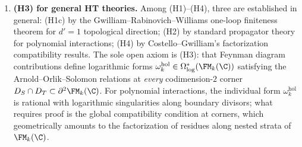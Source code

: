 \begin{enumerate}
 \emph{Geometric reframing via associated variety.}
 The Li--bar spectral sequence
 (Construction~\ref{constr:li-bar-spectral-sequence})
 and the associated-variety criterion
 (Theorem~\ref{thm:associated-variety-koszulness})
 reframe the free strong generation gap geometrically:
 once the full Li associated graded
 $R_{L_k}=\operatorname{gr}^F L_k$ is identified, diagonal
 concentration on the reduced Li--bar $E_2$ page constrains the
 Li--bar $E_2$ page. What the reduced geometry does
 \emph{not} control is the nilradical of~$R_{L_k}$.
 The present theorem does not identify that reduced
 Li--bar page with ordinary Poisson cohomology or with
 $H^*(\widetilde{\mathbb{O}}, \mathcal{O}_{\widetilde{\mathbb{O}}})$
 for a symplectic resolution. Thus non-degenerate admissible
 and minimal-orbit levels have reduced-level test surfaces, but
 unconditional Koszulness still requires a nilradical/reducedness
 check. Large-orbit
 levels ($X = \mathcal{N}$, $\fg = \mathfrak{sl}_N$, $N \geq 3$)
 are explicitly obstructed
 (Proposition~\ref{prop:large-orbit-obstruction}).
 Symplectic-resolution geometry supplies a heuristic guide for the
 hierarchy, not a proof of the nilradical/reducedness step.

\item \textbf{(H3) for general HT theories.}
 Among (H1)--(H4), three are established in general:
 (H1c) by the Gwilliam--Rabinovich--Williams one-loop finiteness
 theorem for $d' = 1$ topological direction; (H2) by standard
 propagator theory for polynomial interactions; (H4) by
 Costello--Gwilliam's factorization compatibility results.
 The sole open axiom is (H3): that Feynman diagram contributions
 define logarithmic forms $\omega_k^{\mathrm{hol}} \in
 \Omega^*_{\log}(\FM_k(\C))$ satisfying the Arnold--Orlik--Solomon
 relations at \emph{every} codimension-$2$ corner
 $D_S \cap D_T \subset \partial^2 \FM_k(\C)$.
 For polynomial interactions, the individual form
 $\omega_k^{\mathrm{hol}}$ is rational with logarithmic
 singularities along boundary divisors; what requires proof
 is the global compatibility condition at corners, which
 geometrically amounts to the factorization of residues
 along nested strata of~$\FM_k(\C)$.


\end{enumerate}
